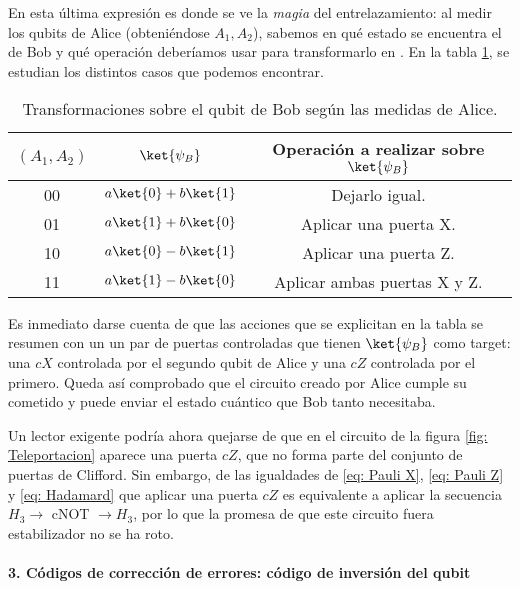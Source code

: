 \documentclass[11pt,a4paper,twoside,pdf]{article}
\numberwithin{equation}{section}
\begin{document}
			En esta última expresión es donde se ve la \textit{magia} del entrelazamiento: al medir los qubits de Alice (obteniéndose $A_1,A_2$), sabemos en qué estado se encuentra el de Bob y qué operación deberíamos usar para transformarlo en \ket{\psi}. En la tabla \ref{tab: AliceBob}, se estudian los distintos casos que podemos encontrar.
			
				\begin{table}[h!]
					\centering
					\begin{tabular}{| c | c | c | }
						\hline
						$(A_1,A_2)$ & $\ket{\psi_B}$ & Operación a realizar sobre $\ket{\psi_B}$\\ \hline
						00 & $a\ket{0}+b\ket{1}$ & Dejarlo igual. \\
						01 & $a\ket{1}+b\ket{0}$ &  Aplicar una puerta X.  \\
						10 & $a\ket{0}-b\ket{1}$ &  Aplicar una puerta Z. \\
						11  & $a\ket{1}-b\ket{0}$ &  Aplicar ambas puertas X y Z. \\ \hline
					\end{tabular}
					\caption{Transformaciones sobre el qubit de Bob según las medidas de Alice.}
					\label{tab: AliceBob}
				\end{table}
			
			Es inmediato darse cuenta de que las acciones que se explicitan en la tabla se resumen con un un par de puertas controladas que tienen $\ket{\psi_B}$ como target: una $cX$ controlada por el segundo qubit de Alice y una $cZ$ controlada por el primero. Queda así comprobado que el circuito creado por Alice cumple su cometido y puede enviar el estado cuántico que Bob tanto necesitaba. 
			
			Un lector exigente podría ahora quejarse de que en el circuito de la figura \ref{fig: Teleportacion} aparece una puerta $cZ$, que no forma parte del conjunto de puertas de Clifford. Sin embargo, de las igualdades de \eqref{eq: Pauli X}, \eqref{eq: Pauli Z} y \eqref{eq: Hadamard} que aplicar una puerta $cZ$ es equivalente a aplicar la secuencia $H_3 \rightarrow$ cNOT $\rightarrow H_3$, por lo que la promesa de que este circuito fuera estabilizador no se ha roto.
			
			
			\paragraph{3. Códigos de corrección de errores: código de inversión del qubit} 	\label{ej: QEC} \hspace{1cm}
			
\end{document}

